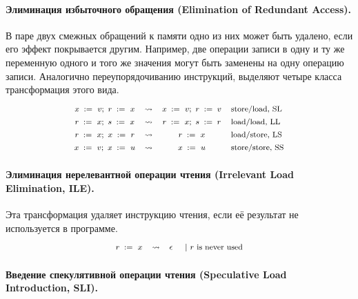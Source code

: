 \paragraph{
Элиминация избыточного обращения
(Elimination of Redundant Access).
} 

В паре двух смежных обращений к памяти
одно из них может быть удалено, 
если его эффект покрывается другим. 
Например, две операции записи в одну и ту же переменную 
одного и того же значения могут быть заменены 
на одну операцию записи. 
Аналогично переупорядочиванию инструкций, 
выделяют четыре класса трансформация этого вида.  
%
\[\def\arraystretch{1.4}\footnotesize
  \begin{array}{cccl} 

      \writeInst{}{x}{v} \seq \readInst{}{r}{x} 
    & \leadsto 
    & \writeInst{}{x}{v} \seq \assignInst{r}{v}
    & \text{store/load, SL}  \\ 

      \readInst{}{r}{x} \seq \readInst{}{s}{x} 
    & \leadsto 
    & \readInst{}{r}{x} \seq \assignInst{s}{r}
    & \text{load/load, LL}  \\ 

      \readInst{}{r}{x} \seq \writeInst{}{x}{r} 
    & \leadsto 
    & \readInst{}{r}{x} 
    & \text{load/store, LS}  \\ 

      \writeInst{}{x}{v} \seq \writeInst{}{x}{u} 
    & \leadsto 
    & \writeInst{}{x}{u}
    & \text{store/store, SS}  \\ 

  \end{array}
\]

\paragraph{
Элиминация нерелевантной операции чтения
(Irrelevant Load Elimination, ILE).
}

Эта трансформация удаляет инструкцию чтения, 
если её результат не используется в программе. 
%
\[\def\arraystretch{1.4}\footnotesize
  \begin{array}{cccl} 

      \readInst{}{r}{x} 
    & \leadsto 
    & \epsInst
    & ~|~ \text{$r$ is never used}  \\ 

  \end{array}
\]

\paragraph{
Введение спекулятивной операции чтения
(Speculative Load Introduction, SLI).
}

